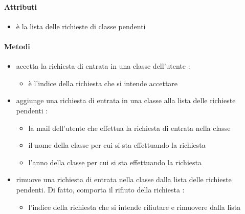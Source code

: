 \paragraph{Attributi}
\begin{itemize}
\item {}
\newline
è la lista delle richieste di classe pendenti
\end{itemize}
\paragraph{Metodi}
\begin{itemize}
\item {}
\newline
accetta la richiesta di entrata in una classe dell'utente
\newline
{} :
\begin{itemize}
\item {}
\newline
è l'indice della richiesta che si intende accettare
\end{itemize}
\item {}
\newline
aggiunge una richiesta di entrata in una classe alla lista delle richieste pendenti
\newline
{} :
\begin{itemize}
\item {}
\newline
la mail dell'utente che effettua la richiesta di entrata nella classe
\item {}
\newline
il nome della classe per cui si sta effettuando la richiesta
\item {}
\newline
l'anno della classe per cui si sta effettuando la richiesta
\end{itemize}
\item {}
\newline
rimuove una richiesta di entrata nella classe dalla lista delle richieste pendenti. Di fatto, comporta il rifiuto della richiesta
\newline
{} :
\begin{itemize}
\item {}
\newline
l'indice della richiesta che si intende rifiutare e rimuovere dalla lista
\end{itemize}
\end{itemize}
